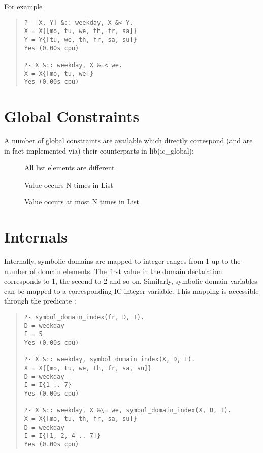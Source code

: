For example
\begin{quote}\begin{verbatim}
?- [X, Y] &:: weekday, X &< Y.
X = X{[mo, tu, we, th, fr, sa]}
Y = Y{[tu, we, th, fr, sa, su]}
Yes (0.00s cpu)

?- X &:: weekday, X &=< we.
X = X{[mo, tu, we]}
Yes (0.00s cpu)
\end{verbatim}\end{quote}
    

\section{Global Constraints}
A number of global constraints are available which directly correspond
(and are in fact implemented via) their counterparts in
lib(ic_global):
\begin{description}
\item[]
    All list elements are different
\item[]
    Value occurs N times in List
\item[]
    Value occurs at most N times in List
\end{description}


\section{Internals}

Internally, symbolic domains are mapped to integer ranges from 1 up to
the number of domain elements.  The first value in the domain
declaration corresponds to 1, the second to 2 and so on.  Similarly,
symbolic domain variables can be mapped to a corresponding IC integer
variable.  This mapping is accessible through the predicate
:
\begin{quote}\begin{verbatim}
?- symbol_domain_index(fr, D, I).
D = weekday
I = 5
Yes (0.00s cpu)

?- X &:: weekday, symbol_domain_index(X, D, I).
X = X{[mo, tu, we, th, fr, sa, su]}
D = weekday
I = I{1 .. 7}
Yes (0.00s cpu)

?- X &:: weekday, X &\= we, symbol_domain_index(X, D, I).
X = X{[mo, tu, th, fr, sa, su]}
D = weekday
I = I{[1, 2, 4 .. 7]}
Yes (0.00s cpu)
\end{verbatim}\end{quote}
    

